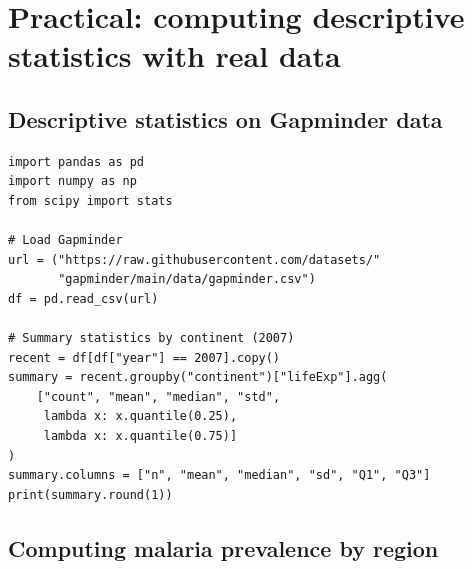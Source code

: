 \section{Practical: computing descriptive statistics with real data}

\subsection{Descriptive statistics on Gapminder data}

\begin{verbatim}
import pandas as pd
import numpy as np
from scipy import stats

# Load Gapminder
url = ("https://raw.githubusercontent.com/datasets/"
       "gapminder/main/data/gapminder.csv")
df = pd.read_csv(url)

# Summary statistics by continent (2007)
recent = df[df["year"] == 2007].copy()
summary = recent.groupby("continent")["lifeExp"].agg(
    ["count", "mean", "median", "std",
     lambda x: x.quantile(0.25),
     lambda x: x.quantile(0.75)]
)
summary.columns = ["n", "mean", "median", "sd", "Q1", "Q3"]
print(summary.round(1))
\end{verbatim}

\subsection{Computing malaria prevalence by region}

